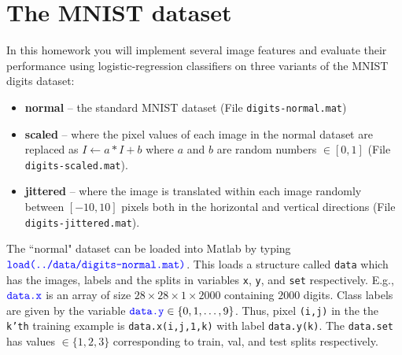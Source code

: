 \documentclass[10pt,letterpaper]{article}
\newcommand{\cmd}[1] {{\color{blue}\texttt{#1}}}
\begin{document}
\newpage

\section*{The MNIST dataset}
In this homework you will implement several image features and evaluate their performance using logistic-regression classifiers on three variants of the MNIST digits dataset:
\begin{itemize}
\item \textbf{normal} -- the standard MNIST dataset (File \cmd{digits-normal.mat})
\item \textbf{scaled} -- where the pixel values of each image in the normal dataset are replaced as $I \leftarrow a*I + b$ where $a$ and $b$ are random numbers $\in [0,1]$ (File \cmd{digits-scaled.mat}). 
\item \textbf{jittered} -- where the image is translated within each image randomly between $[-10,10]$ pixels both in the horizontal and vertical directions (File \cmd{digits-jittered.mat}).
\end{itemize}

The ``normal" dataset can be loaded into Matlab by typing $\cmd{load(../data/digits-normal.mat)}$. This loads a structure called \cmd{data} which has the images, labels and the splits in variables \cmd{x}, \cmd{y}, and \cmd{set} respectively. E.g., $\cmd{data.x}$ is an array of size $28 \times 28 \times 1 \times2000$ containing $2000$ digits. Class labels are given by the variable $\cmd{data.y} \in \{0,1,\ldots, 9\}$. Thus, pixel \cmd{(i,j)} in the the \cmd{k'th} training example is \cmd{data.x(i,j,1,k)} with label \cmd{data.y(k)}. The \cmd{data.set} has values $\in\{1,2,3\}$ corresponding to train, val, and test splits respectively.
\end{document}
